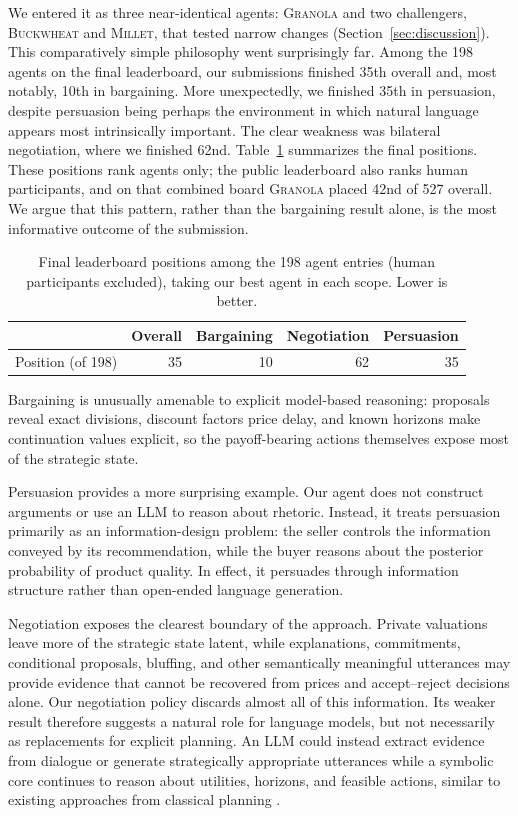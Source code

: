 \documentclass{article}
\newcommand{\competitionname}{\textsc{Granola}}
\newcommand{\challengername}{\textsc{Buckwheat}}
\newcommand{\milletname}{\textsc{Millet}}
\begin{document}
We entered it as three near-identical agents: \competitionname{} and two challengers, \challengername{} and \milletname{}, that tested narrow changes (Section~\ref{sec:discussion}).
This comparatively simple philosophy went surprisingly far.
Among the 198 agents on the final leaderboard, our submissions finished 35th overall and, most notably, 10th in bargaining.
More unexpectedly, we finished 35th in persuasion, despite persuasion being perhaps the environment in which natural language appears most intrinsically important.
The clear weakness was bilateral negotiation, where we finished 62nd.
Table~\ref{tab:ranks} summarizes the final positions.
These positions rank agents only; the public leaderboard also ranks human participants, and on that combined board \competitionname{} placed 42nd of 527 overall.
We argue that this pattern, rather than the bargaining result alone, is the most informative outcome of the submission.


\begin{table}[t]
  \caption{Final leaderboard positions among the 198 agent entries (human participants excluded), taking our best agent in each scope.
  Lower is better.}
  \label{tab:ranks}
  \centering
  \small
  \begin{tabular}{lrrrr}
    \toprule
    & Overall & Bargaining & Negotiation & Persuasion \\
    \midrule
    Position (of 198) & 35 & 10 & 62 & 35 \\
    \bottomrule
  \end{tabular}
\end{table}

Bargaining is unusually amenable to explicit model-based reasoning: proposals reveal exact divisions, discount factors price delay, and known horizons make continuation values explicit, so the payoff-bearing actions themselves expose most of the strategic state.

Persuasion provides a more surprising example.
Our agent does not construct arguments or use an LLM to reason about rhetoric.
Instead, it treats persuasion primarily as an information-design problem: the seller controls the information conveyed by its recommendation, while the buyer reasons about the posterior probability of product quality.
In effect, it persuades through information structure rather than open-ended language generation.

Negotiation exposes the clearest boundary of the approach.
Private valuations leave more of the strategic state latent, while explanations, commitments, conditional proposals, bluffing, and other semantically meaningful utterances may provide evidence that cannot be recovered from prices and accept--reject decisions alone.
Our negotiation policy discards almost all of this information.
Its weaker result therefore suggests a natural role for language models, but not necessarily as replacements for explicit planning.
An LLM could instead extract evidence from dialogue or generate strategically appropriate utterances while a symbolic core continues to reason about utilities, horizons, and feasible actions, similar to existing approaches from classical planning \citep{kambhampatiPositionLLMsCant2024,correaClassicalPlanningLLMGenerated2025}.
\end{document}
